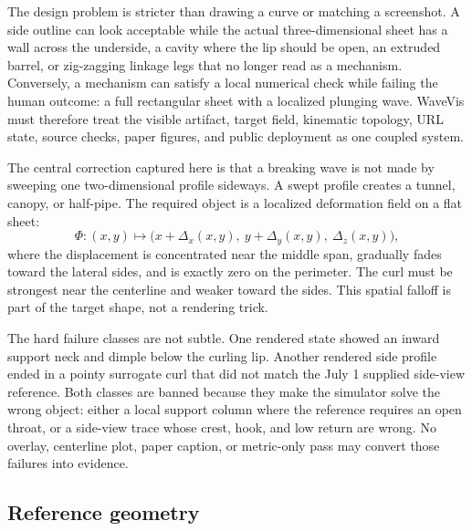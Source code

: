 \documentclass[12pt,letterpaper]{article}
\begin{document}
The design problem is stricter than drawing a curve or matching a screenshot. A side outline can look acceptable while the actual three-dimensional sheet has a wall across the underside, a cavity where the lip should be open, an extruded barrel, or zig-zagging linkage legs that no longer read as a mechanism. Conversely, a mechanism can satisfy a local numerical check while failing the human outcome: a full rectangular sheet with a localized plunging wave. WaveVis must therefore treat the visible artifact, target field, kinematic topology, URL state, source checks, paper figures, and public deployment as one coupled system.

The central correction captured here is that a breaking wave is not made by sweeping one two-dimensional profile sideways. A swept profile creates a tunnel, canopy, or half-pipe. The required object is a localized deformation field on a flat sheet:
\[
  \Phi : (x,y) \mapsto \bigl(x + \Delta_x(x,y),\ y + \Delta_y(x,y),\ \Delta_z(x,y)\bigr),
\]
where the displacement is concentrated near the middle span, gradually fades toward the lateral sides, and is exactly zero on the perimeter. The curl must be strongest near the centerline and weaker toward the sides. This spatial falloff is part of the target shape, not a rendering trick.

The hard failure classes are not subtle. One rendered state showed an inward support neck and dimple below the curling lip. Another rendered side profile ended in a pointy surrogate curl that did not match the July 1 supplied side-view reference. Both classes are banned because they make the simulator solve the wrong object: either a local support column where the reference requires an open throat, or a side-view trace whose crest, hook, and low return are wrong. No overlay, centerline plot, paper caption, or metric-only pass may convert those failures into evidence.

\subsection{Reference geometry}
\end{document}
